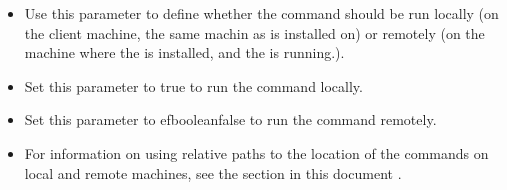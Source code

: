 
\begin{itemize}
\item Use this parameter to define whether the command should be run locally (on the client machine, the same machin as \app{} is installed on) or remotely (on the machine where the \gdagent{} is installed, and the \gdaut{} is running.). 
\item Set this parameter to true to run the command locally.
\item Set this parameter to \app{}efbooleanfalse to run the command remotely. 
\item  For information on using relative paths to the location of the commands on local and remote machines, see the section in this document .
\end{itemize}
